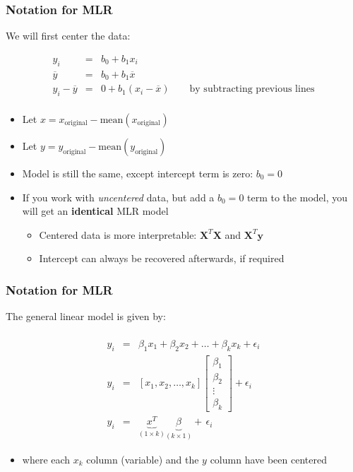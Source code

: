 \begin{frame}\frametitle{Notation for MLR}

	We will first center the data:

	$$
	\begin{array}{rcl}
		y_i &=& b_0 + b_1 x_i \\
		\overline{y} &=& b_0 + b_1 \overline{x} \\
		y_i - \overline{y} &=& 0 +b_1(x_i - \overline{x}) \qquad \text{by subtracting previous lines} \\
	\end{array}
	$$
	\begin{itemize}
		\item	Let $x = x_\text{original} - \text{mean}\left(x_\text{original} \right)$
		\item	Let $y = y_\text{original} - \text{mean}\left(y_\text{original} \right)$
		\item	Model is still the same, except intercept term is zero: $b_0 = 0$
	\end{itemize}
	\begin{itemize}
		\item	If you work with \emph{uncentered} data, but add a $b_0 = 0$ term to the model, you will get an \textbf{identical} MLR model
		\begin{itemize}
			\item	Centered data is more interpretable: $\mathbf{X}^T\mathbf{X}$ and $\mathbf{X}^T\mathbf{y}$
			\item	Intercept can always be recovered afterwards, if required
		\end{itemize}
	\end{itemize}
\end{frame}

\begin{frame}\frametitle{Notation for MLR}

	The general linear model is given by:

	$$
	\begin{array}{rcl}
		\\
		y_i &=& \beta_1 x_1 + \beta_2x_2 + \ldots + \beta_kx_k + \epsilon_i \\
		y_i &=& [x_1, x_2, \ldots, x_k]
		\begin{bmatrix}
			\beta_1 \\
			\beta_2 \\
			\vdots \\
			\beta_k
		\end{bmatrix}
		+ \epsilon_i \\
		y_i &=& \underbrace{\mathit{x}^T}_{(1 \times k)} \underbrace{\beta}_{(k \times 1)} + \,\epsilon_i
	\end{array}
	$$
	\begin{itemize}
		\item	where each $x_k$ column (variable) and the $y$ column have been centered
	\end{itemize}
\end{frame}


